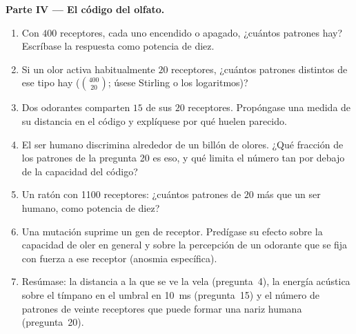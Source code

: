 \begin{problem}
\medskip
\noindent\textbf{Parte IV --- El código del olfato.}
\begin{enumerate}[resume]
  \item Con $400$ receptores, cada uno encendido o apagado, ¿cuántos
        patrones hay? Escríbase la respuesta como potencia de diez.
  \item Si un olor activa habitualmente $20$ receptores, ¿cuántos
        patrones distintos de ese tipo hay ($\binom{400}{20}$; úsese
        Stirling o los logaritmos)?
  \item Dos odorantes comparten $15$ de sus $20$ receptores.
        Propóngase una medida de su distancia en el código y
        explíquese por qué huelen parecido.
  \item El ser humano discrimina alrededor de un billón de olores. ¿Qué
        fracción de los patrones de la pregunta 20 es eso, y qué limita
        el número tan por debajo de la capacidad del código?
  \item Un ratón con \num{1100} receptores: ¿cuántos patrones de $20$
        más que un ser humano, como potencia de diez?
  \item Una mutación suprime un gen de receptor. Predígase su efecto
        sobre la capacidad de oler en general y sobre la percepción de
        un odorante que se fija con fuerza a ese receptor (anosmia
        específica).
  \item Resúmase: la distancia a la que se ve la vela (pregunta~4), la
        energía acústica sobre el tímpano en el umbral en \qty{10}{ms}
        (pregunta~15) y el número de patrones de veinte receptores que
        puede formar una nariz humana (pregunta~20).
\end{enumerate}
\end{problem}
